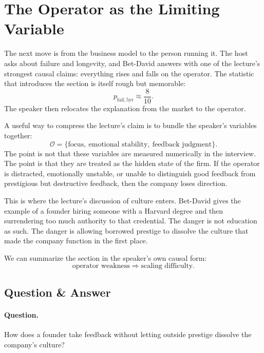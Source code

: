 \section{The Operator as the Limiting Variable}

The next move is from the business model to the person running it. The host asks about failure and longevity, and Bet-David answers with one of the lecture's strongest causal claims: everything rises and falls on the operator. The statistic that introduces the section is itself rough but memorable:
\begin{equation}
p_{\text{fail},5\text{yr}} \approx \frac{8}{10}.
\end{equation}
The speaker then relocates the explanation from the market to the operator.

A useful way to compress the lecture's claim is to bundle the speaker's variables together:
\begin{equation}
\mathcal{O}=\{\text{focus},\ \text{emotional stability},\ \text{feedback judgment}\}.
\end{equation}
The point is not that these variables are measured numerically in the interview. The point is that they are treated as the hidden state of the firm. If the operator is distracted, emotionally unstable, or unable to distinguish good feedback from prestigious but destructive feedback, then the company loses direction.

This is where the lecture's discussion of culture enters. Bet-David gives the example of a founder hiring someone with a Harvard degree and then surrendering too much authority to that credential. The danger is not education as such. The danger is allowing borrowed prestige to dissolve the culture that made the company function in the first place.

We can summarize the section in the speaker's own causal form:
\begin{equation}
\text{operator weakness} \Rightarrow \text{scaling difficulty}.
\end{equation}

\subsection{Question \& Answer}

\paragraph{Question.} How does a founder take feedback without letting outside prestige dissolve the company's culture?

